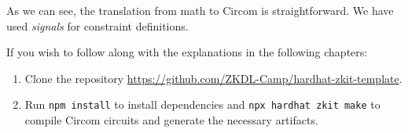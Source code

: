 \documentclass[../lecture-notes-105x135.tex]{subfiles}
\begin{document}
    \begin{center}
        \vspace{-2mm}
        \vspace{-2mm}

    \end{center}

    As we can see, the translation from math to Circom is straightforward.
    We have used \textit{signals} for constraint definitions.

    \begin{remark}
        If you wish to follow along with the explanations in the following chapters:
        \begin{enumerate}
            \item Clone the repository \url{https://github.com/ZKDL-Camp/hardhat-zkit-template}.
            \item Run \texttt{npm install} to install dependencies and \texttt{npx hardhat zkit make}
            to compile Circom circuits and generate the necessary artifacts.
        \end{enumerate}
    \end{remark}
\end{document}
